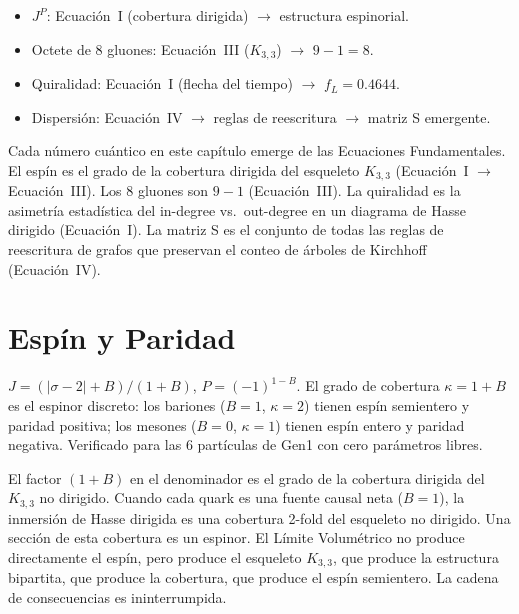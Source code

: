 \documentclass[11pt, a4paper, openany]{book}
\newenvironment{introduction}[1][Sinopsis del M\'odulo]{%
  \begin{tcolorbox}[
    enhanced,colback=structure!5,colframe=structure,
    colbacktitle=structure,coltitle=white,
    fonttitle=\small\bfseries,title={#1},
    arc=2pt,boxrule=0.7pt,
    left=8pt,right=8pt,top=6pt,bottom=6pt,
    before skip=12pt,after skip=12pt
  ]\itshape\begin{itemize}[leftmargin=*,itemsep=2pt,parsep=0pt]
}{%
  \end{itemize}\end{tcolorbox}
}
\begin{document}
\begin{introduction}
  \item $J^P$: Ecuaci\'on~I (cobertura dirigida) $\to$ estructura espinorial.
  \item Octete de 8 gluones: Ecuaci\'on~III ($K_{3,3}$) $\to$ $9 - 1 = 8$.
  \item Quiralidad: Ecuaci\'on~I (flecha del tiempo) $\to$ $f_L = 0.4644$.
  \item Dispersi\'on: Ecuaci\'on~IV $\to$ reglas de reescritura $\to$ matriz S emergente.
\end{introduction}

Cada n\'umero cu\'antico en este cap\'itulo emerge de las Ecuaciones
Fundamentales. El esp\'in es el grado de la cobertura dirigida del
esqueleto $K_{3,3}$ (Ecuaci\'on~I $\to$ Ecuaci\'on~III). Los 8 gluones
son $9 - 1$ (Ecuaci\'on~III). La quiralidad es la asimetr\'ia
estad\'istica del in-degree vs.\ out-degree en un diagrama de Hasse
dirigido (Ecuaci\'on~I). La matriz S es el conjunto de todas las reglas
de reescritura de grafos que preservan el conteo de \'arboles de
Kirchhoff (Ecuaci\'on~IV).

\section{Esp\'in y Paridad}

\begin{theorem}
$J = (|\sigma - 2| + B)/(1 + B)$, \;$P = (-1)^{1-B}$.
El grado de cobertura $\kappa = 1 + B$ es el espinor discreto:
los bariones ($B = 1$, $\kappa = 2$) tienen esp\'in semientero y
paridad positiva; los mesones ($B = 0$, $\kappa = 1$) tienen esp\'in
entero y paridad negativa. Verificado para las 6 part\'iculas de
Gen1 con cero par\'ametros libres.

El factor $(1 + B)$ en el denominador es el grado de la cobertura
dirigida del $K_{3,3}$ no dirigido. Cuando cada quark es una fuente
causal neta ($B = 1$), la inmersi\'on de Hasse dirigida es una
cobertura 2-fold del esqueleto no dirigido. Una secci\'on de esta
cobertura es un espinor. El L\'imite Volum\'etrico no produce
directamente el esp\'in, pero produce el esqueleto $K_{3,3}$, que
produce la estructura bipartita, que produce la cobertura, que produce
el esp\'in semientero. La cadena de consecuencias es ininterrumpida.
\end{theorem}
\end{document}
